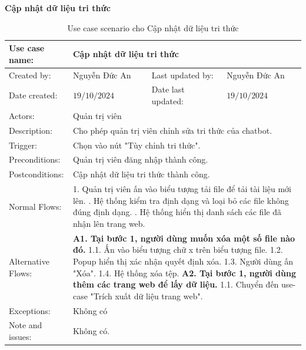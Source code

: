 \textbf{Cập nhật dữ liệu tri thức}
\begin{table}[H]
	\centering
	\begin{tabular}{|l|l|l|l|} 
		\hline Use case name: & \multicolumn{3}{|l|}{Cập nhật dữ liệu tri thức} \\ 
		\hline Created by: & Nguyễn Đức An & Last updated by: & Nguyễn Đức An \\ 
		\hline Date created: & $19 / 10 / 2024$ & Date last updated: & $19 / 10 / 2024$\\ 
		\hline Actors: & \multicolumn{3}{|l|}{ Quản trị viên } \\ 
		\hline Description: & \multicolumn{3}{|p{12cm}|}{ Cho phép quản trị viên chỉnh sửa tri thức của chatbot. } \\ 
		\hline Trigger: & \multicolumn{3}{|p{12cm}|}{ Chọn vào nút "Tùy chỉnh tri thức". } \\ 
		\hline Preconditions: & \multicolumn{3}{|p{12cm}|}{ 
			Quản trị viên đăng nhập thành công. 
		} \\ 
		\hline Postconditions: & \multicolumn{3}{|p{12cm}|}{ 
			Cập nhật dữ liệu tri thức thành công. 
		} \\ 
		\hline Normal Flows: & \multicolumn{3}{|p{12cm}|}{ 
			1. Quản trị viên ấn vào biểu tượng tải file để tải tài liệu mới lên. \newline 
			2. Hệ thống kiểm tra định dạng và loại bỏ các file không đúng định dạng. \newline 
			3. Hệ thống hiển thị danh sách các file đã nhận lên trang web. 
		} \\ 
		\hline Alternative Flows: & \multicolumn{3}{|p{12cm}|}{ 
			\textbf{A1. Tại bước 1, người dùng muốn xóa một số file nào đó. }\newline 
			\hspace{0.5cm}1.1. Ấn vào biểu tượng chữ x trên biểu tượng file. \newline 
			\hspace{0.5cm}1.2. Popup hiển thị xác nhận quyết định xóa. \newline 
			\hspace{0.5cm}1.3. Người dùng ấn "Xóa". \newline 
			\hspace{0.5cm}1.4. Hệ thống xóa tệp. \newline 
			\textbf{A2. Tại bước 1, người dùng thêm các trang web để lấy dữ liệu. }\newline 
			\hspace{0.5cm}1.1. Chuyển đến use-case "Trích xuất dữ liệu trang web". 
		} \\ 
		\hline Exceptions: & \multicolumn{3}{|p{12cm}|}{ 
			Không có
		} \\ 
		\hline Note and issues: & \multicolumn{3}{|p{12cm}|}{ Không có. } \\ 
		\hline
	\end{tabular}
	\caption{Use case scenario cho Cập nhật dữ liệu tri thức}
\end{table}

